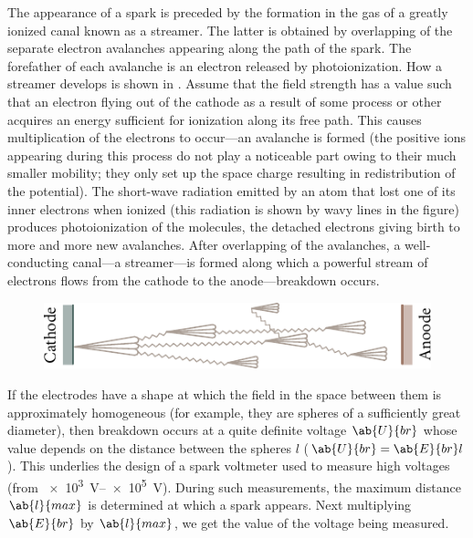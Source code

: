 The appearance of a spark is preceded by the formation in the gas of a greatly ionized canal known as a streamer.
The latter is obtained by overlapping of the separate electron avalanches appearing along the path of the spark.
The forefather of each avalanche is an electron released by photoionization.
How a streamer develops is shown in .
Assume that the field strength has a value such that an electron flying out of the cathode as a result of some process or other acquires an energy sufficient for ionization along its free path.
This causes multiplication of the electrons to occur---an avalanche is formed (the positive ions appearing during this process do not play a noticeable part owing to their much smaller mobility; they only set up the space charge resulting in redistribution of the potential).
The short-wave radiation emitted by an atom that lost one of its inner electrons when ionized (this radiation is shown by wavy lines in the figure) produces photoionization of the molecules, the detached electrons giving birth to more and more new avalanches.
After overlapping of the avalanches, a well-conducting canal---a streamer---is formed along which a powerful stream of electrons flows from the cathode to the anode---breakdown occurs.

\begin{figure}[t]
	\begin{center}
		\includegraphics[scale=1]{figures/ch_12/fig_12_10.pdf}
		\caption[]{}
		\label{fig:12_10}
	\end{center}
	\vspace{-0.8cm}
\end{figure}

If the electrodes have a shape at which the field in the space between them is approximately homogeneous (for example, they are spheres of a sufficiently great diameter), then breakdown occurs at a quite definite voltage $\ab{U}{br}$ whose value depends on the distance between the spheres $l$ ($\ab{U}{br} = \ab{E}{br}l$).
This underlies the design of a spark voltmeter used to measure high voltages (from \SIrange{e3}{e5}{\volt}).
During such measurements, the maximum distance $\ab{l}{max}$ is determined at which a spark appears.
Next multiplying $\ab{E}{br}$ by $\ab{l}{max}$, we get the value of the voltage being measured.

